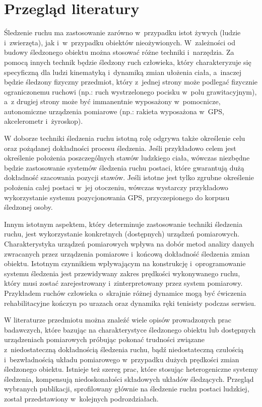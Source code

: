 \chapter{Przegląd literatury}\label{chap:literature}

Śledzenie ruchu ma zastosowanie zarówno w~przypadku istot żywych (ludzie i~zwierzęta), jak i~w~przypadku obiektów nieożywionych. W~zależności od budowy śledzonego obiektu można stosować różne techniki i~narzędzia. Za pomocą innych technik będzie śledzony ruch człowieka, który charakteryzuje się specyficzną dla ludzi kinematyką i~dynamiką zmian ułożenia ciała, a~inaczej będzie śledzony fizyczny przedmiot, który z~jednej strony może podlegać fizycznie ograniczonemu ruchowi (np.: ruch wystrzelonego pocisku w~polu grawitacyjnym), a~z drugiej strony może być immanentnie wyposażony w~pomocnicze, autonomiczne urządzenia pomiarowe (np.: rakieta wyposażona w~GPS, akcelerometr i~żyroskop). 

W doborze techniki śledzenia ruchu istotną rolę odgrywa także określenie celu oraz pożądanej dokładności procesu śledzenia. Jeśli przykładowo celem jest określenie położenia poszczególnych stawów ludzkiego ciała, wówczas niezbędne będzie zastosowanie systemów śledzenia ruchu postaci, które gwarantują dużą dokładność szacowania pozycji stawów. Jeśli istotne jest tylko zgrubne określenie położenia całej postaci w~jej otoczeniu, wówczas wystarczy przykładowo wykorzystanie systemu pozycjonowania GPS, przyczepionego do korpusu śledzonej osoby.

Innym istotnym aspektem, który determinuje zastosowanie techniki śledzenia ruchu, jest wykorzystanie konkretnych (dostępnych) urządzeń pomiarowych. Charakterystyka urządzeń pomiarowych wpływa na dobór metod analizy danych zwracanych przez urządzenia pomiarowe i~końcową dokładność śledzenia zmian obiektu. Istotnym czynnikiem wpływającym na konstrukcję i~oprogramowanie systemu śledzenia jest przewidywany zakres prędkości wykonywanego ruchu, który musi zostać zarejestrowany i~zinterpretowany przez system pomiarowy. Przykładem ruchów człowieka o~skrajnie różnej dynamice  mogą być ćwiczenia rehabilitacyjne kończyn po urazach oraz dynamika ręki tenisisty podczas serwisu.  

W literaturze przedmiotu można znaleźć wiele opisów prowadzonych prac badawczych, które bazując na charakterystyce śledzonego obiektu lub dostępnych urządzeniach pomiarowych próbując pokonać trudności związane z~niedostateczną dokładnością śledzenia ruchu, bądź niedostateczną czułością i~bezwładnością układu pomiarowego w~przypadku dużych prędkości zmian śledzonego obiektu. Istnieje też szereg prac, które stosując heterogeniczne systemy śledzenia, kompensują niedoskonałości składowych układów śledzących. 
Przegląd wybranych publikacji, sprofilowany głównie na śledzenie ruchu postaci ludzkiej, został przedstawiony w~kolejnych podrozdziałach.

